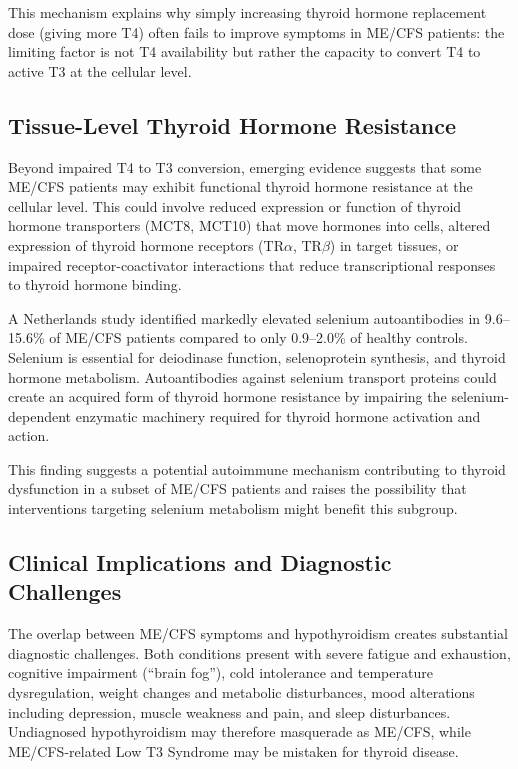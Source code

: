 This mechanism explains why simply increasing thyroid hormone replacement dose (giving more T4) often fails to improve symptoms in ME/CFS patients: the limiting factor is not T4 availability but rather the capacity to convert T4 to active T3 at the cellular level.

\subsection{Tissue-Level Thyroid Hormone Resistance}

Beyond impaired T4 to T3 conversion, emerging evidence suggests that some ME/CFS patients may exhibit functional thyroid hormone resistance at the cellular level. This could involve reduced expression or function of thyroid hormone transporters (MCT8, MCT10) that move hormones into cells, altered expression of thyroid hormone receptors (TR$\alpha$, TR$\beta$) in target tissues, or impaired receptor-coactivator interactions that reduce transcriptional responses to thyroid hormone binding.

\begin{observation}
\label{obs:selenium-antibodies}
A Netherlands study identified markedly elevated selenium autoantibodies in 9.6--15.6\% of ME/CFS patients compared to only 0.9--2.0\% of healthy controls. Selenium is essential for deiodinase function, selenoprotein synthesis, and thyroid hormone metabolism. Autoantibodies against selenium transport proteins could create an acquired form of thyroid hormone resistance by impairing the selenium-dependent enzymatic machinery required for thyroid hormone activation and action.
\end{observation}

This finding suggests a potential autoimmune mechanism contributing to thyroid dysfunction in a subset of ME/CFS patients and raises the possibility that interventions targeting selenium metabolism might benefit this subgroup.

\subsection{Clinical Implications and Diagnostic Challenges}

The overlap between ME/CFS symptoms and hypothyroidism creates substantial diagnostic challenges. Both conditions present with severe fatigue and exhaustion, cognitive impairment (``brain fog''), cold intolerance and temperature dysregulation, weight changes and metabolic disturbances, mood alterations including depression, muscle weakness and pain, and sleep disturbances. Undiagnosed hypothyroidism may therefore masquerade as ME/CFS, while ME/CFS-related Low T3 Syndrome may be mistaken for thyroid disease.


